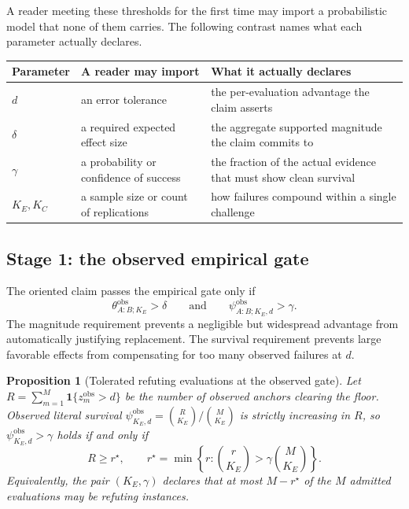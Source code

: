 \documentclass[11pt]{article}
\newtheorem{proposition}{Proposition}
\theoremstyle{remark}
\begin{document}
A reader meeting these thresholds for the first time may import a probabilistic
model that none of them carries. The following contrast names what each
parameter actually declares.
\begin{center}
\begin{tabularx}{0.96\textwidth}{@{}l>{\raggedright\arraybackslash}X>{\raggedright\arraybackslash}X@{}}
\toprule
Parameter & A reader may import & What it actually declares \\
\midrule
$d$ & an error tolerance & the per-evaluation advantage the claim asserts \\
$\delta$ & a required expected effect size & the aggregate supported magnitude the claim commits to \\
$\gamma$ & a probability or confidence of success & the fraction of the actual evidence that must show clean survival \\
$K_E,K_C$ & a sample size or count of replications & how failures compound within a single challenge \\
\bottomrule
\end{tabularx}
\end{center}

\subsection{Stage 1: the observed empirical gate}

The oriented claim passes the empirical gate only if
\begin{equation}
\theta^{\mathrm{obs}}_{A:B;K_E}>\delta
\qquad\text{and}\qquad
\psi^{\mathrm{obs}}_{A:B;K_E,d}>\gamma.
\label{eq:observed-gate}
\end{equation}
The magnitude requirement prevents a negligible but widespread advantage from
automatically justifying replacement. The survival requirement prevents large
favorable effects from compensating for too many observed failures at $d$.

\begin{proposition}[Tolerated refuting evaluations at the observed gate]
\label{prop:count}
Let $R=\sum_{m=1}^M\mathbf 1\{z_m^{\mathrm{obs}}>d\}$ be the number of observed
anchors clearing the floor. Observed literal survival
$\psi^{\mathrm{obs}}_{K_E,d}=\binom{R}{K_E}/\binom{M}{K_E}$ is strictly
increasing in $R$, so $\psi^{\mathrm{obs}}_{K_E,d}>\gamma$ holds if and only if
\[
R\geq r^\star,
\qquad
r^\star=\min\left\{r:\binom{r}{K_E}>\gamma\binom{M}{K_E}\right\}.
\]
Equivalently, the pair $(K_E,\gamma)$ declares that at most $M-r^\star$ of the
$M$ admitted evaluations may be refuting instances.
\end{proposition}
\end{document}
